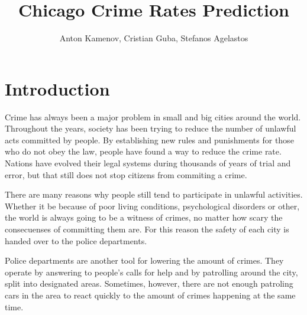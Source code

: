 \documentclass[a4paper, twocolumn]{article}
\author{Anton Kamenov, Cristian Guba, Stefanos Agelastos}
\title{Chicago Crime Rates Prediction}
\begin{document}
\onecolumn

\tableofcontents

\newpage

\listoffigures

\newpage
\twocolumn

\section{Introduction\label{sec:Introduction}}

Crime has always been a major problem in small and big cities around the world.
Throughout the years, society has been trying to reduce the number of unlawful acts committed by people.
By establishing new rules and punishments for those who do not obey the law, people have found a way to reduce the crime rate.
Nations have evolved their legal systems during thousands of years of trial and error, but that still does not stop citizens from commiting a crime.

There are many reasons why people still tend to participate in unlawful activities. 
Whether it be because of poor living conditions, psychological disorders or other, the world is always going to be a witness of crimes, no matter how scary the consecuenses of committing them are.
For this reason the safety of each city is handed over to the police departments.

Police departments are another tool for lowering the amount of crimes.
They operate by answering to people's calls for help and by patrolling around the city, split into designated areas.
Sometimes, however, there are not enough patroling cars in the area to react quickly to the amount of crimes happening at the same time.
\end{document}
